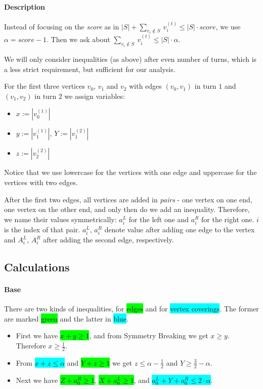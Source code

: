 \documentclass[12pt, A4]{article}
\begin{document}
\paragraph{Description}
Instead of focusing on the \textit{score} as in $|S| + \sum_{v_i \not \in S} \ v_i^{(t)} \le |S| \cdot score$, we use $\alpha = score - 1$. Then we ask about $\sum_{v_i \not \in S} \ v_i^{(t)} \le |S| \cdot \alpha$.

We will only consider inequalities (as above) after even number of turns, which is a less strict requirement, but sufficient for our analysis.

For the first three vertices $v_0$, $v_1$ and $v_2$ with edges $(v_0, v_1)$ in turn $1$ and $(v_1, v_2)$ in turn $2$ we assign variables:
\begin{itemize}
    \item $x := |v_0^{(1)}|$
    \item $y := |v_1^{(1)}|$, $Y := |v_1^{(2)}|$
    \item $z := |v_2^{(2)}|$
\end{itemize}

Notice that we use lowercase for the vertices with one edge and uppercase for the vertices with two edges.

After the first two edges, all vertices are added in \textit{pairs} - one vertex on one end, one vertex on the other end, and only then do we add an inequality. Therefore, we name their values symmetrically: $a_i^L$ for the left one and $a_i^R$ for the right one. $i$ is the index of that pair. $a_i^L$, $a_i^R$ denote value after adding one edge to the vertex and $A_i^L$, $A_i^R$ after adding the second edge, respectively.


\subsection{Calculations}
\paragraph{Base}
There are two kinds of inequalities, for \colorbox{lime}{edges} and for \colorbox{cyan}{vertex coverings}. The former are marked \colorbox{lime}{green} and the latter in \colorbox{cyan}{blue}.
\begin{itemize}
    \item First we have \colorbox{lime}{$x + y \ge 1$}, and from Symmetry Breaking we get $x \ge y$. Therefore $x \ge \frac{1}{2}$.
    \item From \colorbox{cyan}{$x + z \le \alpha$} and \colorbox{lime}{$Y + z \ge 1$} we get $z \le \alpha - \frac{1}{2}$ and $Y \ge \frac{3}{2} - \alpha$.
    \item Next we have \colorbox{lime}{$Z + a_0^R \ge 1$}, \colorbox{lime}{$X + a_0^L \ge 1$}, and \colorbox{cyan}{$a_0^L + Y + a_0^R \le 2 \cdot \alpha$}.
\end{itemize}
\end{document}
